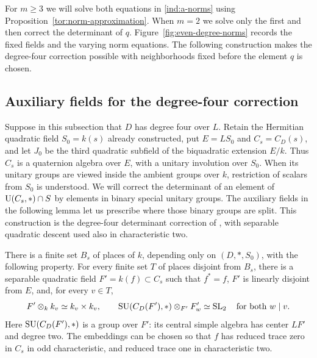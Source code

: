 For $m\geq3$ we will solve both equations in
\eqref{ind:a-norms} using Proposition~\ref{tor:norm-approximation}.  When
$m=2$ we solve only the first and then correct the determinant of $q$.
Figure~\ref{fig:even-degree-norms} records the fixed fields and the
varying norm equations.  The following construction makes the
degree-four correction possible with neighborhoods fixed before the
element $q$ is chosen.


\FloatBarrier

\subsection{Auxiliary fields for the degree-four correction}
\label{ind:auxiliary-fields}

Suppose in this subsection that $D$ has degree four over $L$.
Retain the Hermitian quadratic field $S_0=k(s)$ already constructed,
put $E=LS_0$ and $C_s=C_D(s)$, and let $J_0$ be the third quadratic
subfield of the biquadratic extension $E/k$.  Thus $C_s$ is a
quaternion algebra over $E$, with a unitary involution over $S_0$.
When its unitary groups are viewed inside the ambient groups over
$k$, restriction of scalars from $S_0$ is understood.
We will correct the determinant of an element of
$\operatorname{U}(C_s,*)\cap S$ by elements in binary special unitary groups.
The auxiliary fields in the following lemma let us prescribe where
those binary groups are split.  This construction is the degree-four
determinant correction of \cite[Section~7]{MPNF}, with separable
quadratic descent used also in characteristic two.

\begin{lemma}\label{ind:auxiliary-fields-lemma}
There is a finite set $B_s$ of places of $k$, depending only on
$(D,*,S_0)$, with the following property.  For every finite set $T$
of places disjoint from $B_s$, there is a separable quadratic field
$F'=k(f)\subset C_s$ such that $f^*=f$, $F'$ is linearly disjoint
from $E$, and, for every $v\in T$,
\[
 F'\otimes_k k_v\simeq k_v\times k_v,
 \qquad
 \operatorname{SU}(C_D(F'),*)\otimes_{F'} F'_w\simeq\operatorname{SL}_2
 \quad\text{for both }w\mid v.
\]
Here $\operatorname{SU}(C_D(F'),*)$ is a group over $F'$: its central simple
algebra has center $LF'$ and degree two.  The embeddings can be
chosen so that $f$ has reduced trace zero in $C_s$ in odd
characteristic, and reduced trace one in characteristic two.
\end{lemma}

